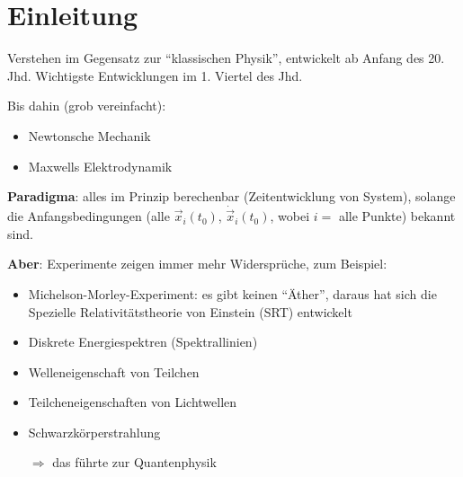 \chapter{Einleitung}

Verstehen im Gegensatz zur "`klassischen Physik"', entwickelt ab Anfang des 20. Jhd. Wichtigste Entwicklungen im 1. Viertel des Jhd.

Bis dahin (grob vereinfacht):
\begin{itemize}
	\item Newtonsche Mechanik
	\item Maxwells Elektrodynamik
\end{itemize}

\textbf{Paradigma}: alles im Prinzip berechenbar (Zeitentwicklung von System), solange die Anfangsbedingungen (alle $\vec{x}_i(t_0)$, $\dot{\vec{x}}_i(t_0)$, wobei $i =$ alle Punkte) bekannt sind.

\textbf{Aber}: Experimente zeigen immer mehr Widersprüche, zum Beispiel:
\begin{itemize}
	\item Michelson-Morley-Experiment: es gibt keinen "`Äther"', daraus hat sich die Spezielle Relativitätstheorie von Einstein (SRT) entwickelt
	\item Diskrete Energiespektren (Spektrallinien)
	\item Welleneigenschaft von Teilchen
	\item Teilcheneigenschaften von Lichtwellen
	\item Schwarzkörperstrahlung
	\item[$\Rightarrow$] das führte zur Quantenphysik 
\end{itemize}

